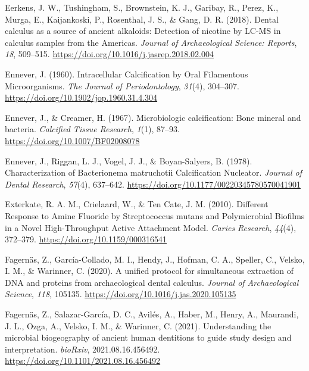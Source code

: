 \documentclass[
  letterpaper,
]{book}
\newlength{\cslhangindent}
\newlength{\cslentryspacingunit} %
\newenvironment{CSLReferences}[2] %
 {%
  \setlength{\parindent}{0pt}
  \ifodd #1
  \let\oldpar\par
  \def\par{\hangindent=\cslhangindent\oldpar}
  \fi
  \setlength{\parskip}{#2\cslentryspacingunit}
 }%
 {}
\begin{document}
\begin{CSLReferences}{1}{0}
\leavevmode{}%
Eerkens, J. W., Tushingham, S., Brownstein, K. J., Garibay, R., Perez,
K., Murga, E., Kaijankoski, P., Rosenthal, J. S., \& Gang, D. R. (2018).
Dental calculus as a source of ancient alkaloids: {Detection} of
nicotine by {LC-MS} in calculus samples from the {Americas}.
\emph{Journal of Archaeological Science: Reports}, \emph{18}, 509--515.
\url{https://doi.org/10.1016/j.jasrep.2018.02.004}

\leavevmode{}%
Ennever, J. (1960). Intracellular {Calcification} by {Oral Filamentous
Microorganisms}. \emph{The Journal of Periodontology}, \emph{31}(4),
304--307. \url{https://doi.org/10.1902/jop.1960.31.4.304}

\leavevmode{}%
Ennever, J., \& Creamer, H. (1967). Microbiologic calcification: {Bone}
mineral and bacteria. \emph{Calcified Tissue Research}, \emph{1}(1),
87--93. \url{https://doi.org/10.1007/BF02008078}

\leavevmode{}%
Ennever, J., Riggan, L. J., Vogel, J. J., \& Boyan-Salyers, B. (1978).
Characterization of {Bacterionema} matruchotii {Calcification
Nucleator}. \emph{Journal of Dental Research}, \emph{57}(4), 637--642.
\url{https://doi.org/10.1177/00220345780570041901}

\leavevmode{}%
Exterkate, R. A. M., Crielaard, W., \& Ten Cate, J. M. (2010). Different
{Response} to {Amine Fluoride} by {Streptococcus} mutans and
{Polymicrobial Biofilms} in a {Novel High-Throughput Active Attachment
Model}. \emph{Caries Research}, \emph{44}(4), 372--379.
\url{https://doi.org/10.1159/000316541}

\leavevmode{}%
Fagernäs, Z., García-Collado, M. I., Hendy, J., Hofman, C. A., Speller,
C., Velsko, I. M., \& Warinner, C. (2020). A unified protocol for
simultaneous extraction of {DNA} and proteins from archaeological dental
calculus. \emph{Journal of Archaeological Science}, \emph{118}, 105135.
\url{https://doi.org/10.1016/j.jas.2020.105135}

\leavevmode{}%
Fagernäs, Z., Salazar-García, D. C., Avilés, A., Haber, M., Henry, A.,
Maurandi, J. L., Ozga, A., Velsko, I. M., \& Warinner, C. (2021).
Understanding the microbial biogeography of ancient human dentitions to
guide study design and interpretation. \emph{bioRxiv},
2021.08.16.456492. \url{https://doi.org/10.1101/2021.08.16.456492}


\end{CSLReferences}
\end{document}
